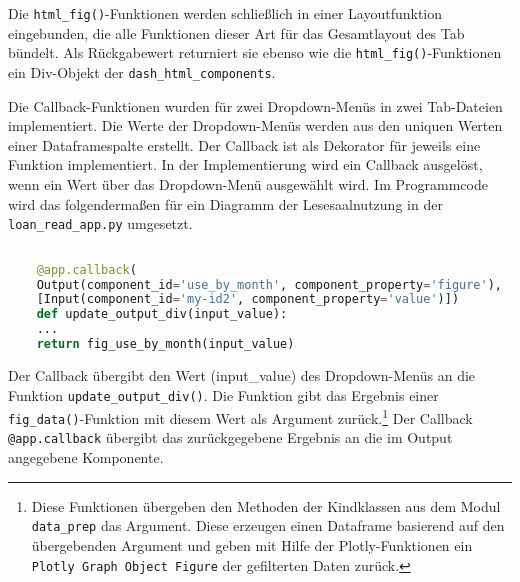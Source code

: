     Die \texttt{html\_fig()}-Funktionen werden schließlich in einer Layoutfunktion eingebunden, die alle Funktionen dieser Art
    für das Gesamtlayout des Tab bündelt. Als Rückgabewert returniert sie ebenso wie die \texttt{html\_fig()}-Funktionen ein Div-Objekt der \texttt{dash\_html\_components}.


    Die Callback-Funktionen wurden für zwei Dropdown-Menüs in zwei Tab-Dateien implementiert.
    Die Werte der Dropdown-Menüs werden aus den uniquen Werten einer Dataframespalte erstellt.
    Der Callback ist als Dekorator für jeweils eine Funktion implementiert. 
    In der Implementierung wird ein Callback ausgelöst, wenn ein Wert über das Dropdown-Menü ausgewählt wird.
    Im Programmcode wird das folgendermaßen für ein Diagramm der Lesesaalnutzung in der \texttt{loan\_read\_app.py} umgesetzt.

    \begin{lstlisting}[language=Python, caption={html\_fig\_total\_expnd()}]        
    
    @app.callback(
    Output(component_id='use_by_month', component_property='figure'),
    [Input(component_id='my-id2', component_property='value')])
    def update_output_div(input_value):
    ...
    return fig_use_by_month(input_value)
    \end{lstlisting}


 
    Der Callback übergibt den Wert (input\_value) des Dropdown-Menüs an die Funktion \texttt{update\_output\_div()}. 
    Die Funktion gibt das Ergebnis einer \texttt{fig\_data()}-Funktion mit diesem Wert als Argument zurück.\footnote{Diese Funktionen übergeben den Methoden der Kindklassen aus dem Modul \texttt{data\_prep} das Argument. 
    Diese erzeugen einen Dataframe basierend auf den übergebenden Argument und geben mit Hilfe der Plotly-Funktionen ein \texttt{Plotly Graph Object Figure} der gefilterten Daten zurück.}
    Der Callback \texttt{@app.callback} übergibt das zurückgegebene Ergebnis an die im Output angegebene Komponente.
    
